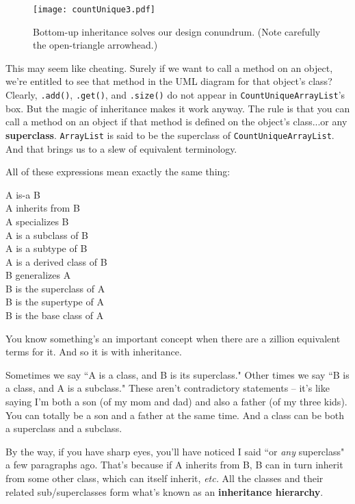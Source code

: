 \begin{figure}
\centering
\texttt{[image: countUnique3.pdf]}
\caption{Bottom-up inheritance solves our design conundrum. (Note carefully the
open-triangle arrowhead.)}
\label{fig:countUnique3}
\end{figure}

This may seem like cheating. Surely if we want to call a method on an object,
we're entitled to see that method in the UML diagram for that object's class?
Clearly, \texttt{.add()}, \texttt{.get()}, and \texttt{.size()} do not appear
in \texttt{CountUniqueArrayList}'s box. But the magic of inheritance makes it
work anyway. The rule is that you can call a method on an object if that
method is defined on the object's class...or any \textbf{superclass}.
\texttt{ArrayList} is said to be the superclass of
\texttt{CountUniqueArrayList}. And that brings us to a slew of equivalent
terminology.

\begin{samepage}
All of these expressions mean exactly the same thing:
\begin{center}
A is-a B\\
A inherits from B\\
A specializes B\\
A is a subclass of B\\
A is a subtype of B\\
A is a derived class of B\\
B generalizes A\\
B is the superclass of A\\
B is the supertype of A\\
B is the base class of A\\
\end{center}
\end{samepage}

You know something's an important concept when there are a zillion equivalent
terms for it. And so it is with inheritance.

Sometimes we say ``A is a class, and B is its superclass." Other times we say
``B is a class, and A is a subclass." These aren't contradictory statements --
it's like saying I'm both a son (of my mom and dad) and also a father (of my
three kids). You can totally be a son and a father at the same time. And a
class can be both a superclass and a subclass.

By the way, if you have sharp eyes, you'll have noticed I said ``or
\textit{any} superclass" a few paragraphs ago. That's because if A inherits
from B, B can in turn inherit from some other class, which can itself inherit,
\textit{etc.} All the classes and their related sub/superclasses form what's
known as an \textbf{inheritance hierarchy}.

